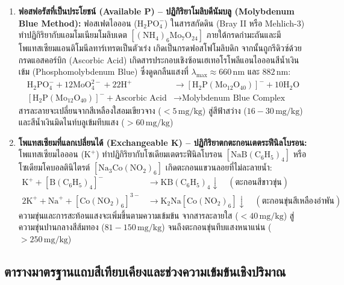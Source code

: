 \begin{enumerate}
    \item \textbf{ฟอสฟอรัสที่เป็นประโยชน์ (Available P) -- ปฏิกิริยาโมลิบดีนัมบลู (Molybdenum Blue Method):}
    ฟอสเฟตไอออน ($\text{H}_2\text{PO}_4^-$) ในสารสกัดดิน (Bray II หรือ Mehlich-3) ทำปฏิกิริยากับแอมโมเนียมโมลิบเดต $[(\text{NH}_4)_6\text{Mo}_7\text{O}_{24}]$ ภายใต้กรดกำมะถันและมีโพแทสเซียมแอนติโมนีลทาร์เทรตเป็นตัวเร่ง เกิดเป็นกรดฟอสโฟโมลิบดิก จากนั้นถูกรีดิวซ์ด้วยกรดแอสคอร์บิก (Ascorbic Acid) เกิดสารประกอบเชิงซ้อนเฮเทอโรโพลีแอนไอออนสีน้ำเงินเข้ม (Phosphomolybdenum Blue) ซึ่งดูดกลืนแสงที่ $\lambda_{\max} \approx 660\,\text{nm}$ และ $882\,\text{nm}$:
    \begin{align}
        \text{H}_2\text{PO}_4^- + 12\text{MoO}_4^{2-} + 22\text{H}^+ &\longrightarrow [\text{H}_2\text{P}(\text{Mo}_{12}\text{O}_{40})]^{-} + 10\text{H}_2\text{O} \\
        [\text{H}_2\text{P}(\text{Mo}_{12}\text{O}_{40})]^{-} + \text{Ascorbic Acid} &\longrightarrow \text{Molybdenum Blue Complex}
    \end{align}
    สารละลายจะเปลี่ยนจากสีเหลืองใสอมเขียวจาง ($< 5\,\text{mg/kg}$) สู่สีฟ้าสว่าง ($16 - 30\,\text{mg/kg}$) และสีน้ำเงินมิดไนท์บลูเข้มทึบแสง ($> 60\,\text{mg/kg}$)

    \item \textbf{โพแทสเซียมที่แลกเปลี่ยนได้ (Exchangeable K) -- ปฏิกิริยาตกตะกอนเตตระฟีนิลโบรอน:}
    โพแทสเซียมไอออน ($\text{K}^+$) ทำปฏิกิริยากับโซเดียมเตตระฟีนิลโบรอน $[\text{NaB}(\text{C}_6\text{H}_5)_4]$ หรือโซเดียมโคบอลตินิไตรต์ $[\text{Na}_3\text{Co}(\text{NO}_2)_6]$ เกิดตะกอนแขวนลอยที่ไม่ละลายน้ำ:
    \begin{align}
        \text{K}^+ + [\text{B}(\text{C}_6\text{H}_5)_4]^- &\longrightarrow \text{KB}(\text{C}_6\text{H}_5)_4 \downarrow \quad (\text{ตะกอนสีขาวขุ่น}) \\
        2\text{K}^+ + \text{Na}^+ + [\text{Co}(\text{NO}_2)_6]^{3-} &\longrightarrow \text{K}_2\text{Na}[\text{Co}(\text{NO}_2)_6] \downarrow \quad (\text{ตะกอนขุ่นสีเหลืองอำพัน})
    \end{align}
    ความขุ่นและการสะท้อนแสงจะเพิ่มขึ้นตามความเข้มข้น จากสารละลายใส ($< 40\,\text{mg/kg}$) สู่ความขุ่นปานกลางสีส้มทอง ($81 - 150\,\text{mg/kg}$) จนถึงตะกอนขุ่นทึบแสงหนาแน่น ($> 250\,\text{mg/kg}$)
\end{enumerate}

\subsection{ตารางมาตรฐานแถบสีเทียบเคียงและช่วงความเข้มข้นเชิงปริมาณ}

